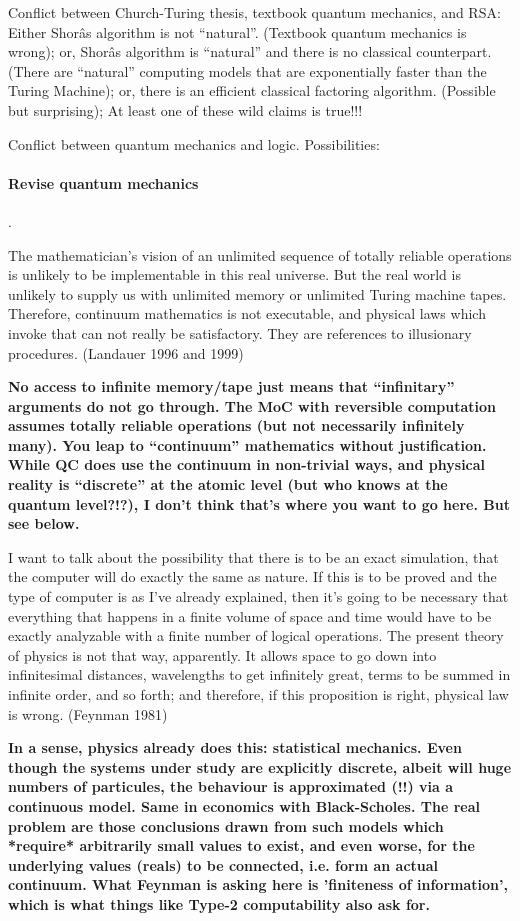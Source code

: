 \documentclass[12pt]{article}
\newcommand{\jc}[1]{\fbox{Jacques says:} \textbf{#1}}
\begin{document}
Conflict between Church-Turing thesis, textbook quantum mechanics, and
RSA: Either Shorâs algorithm is not ``natural''. (Textbook quantum
mechanics is wrong); or, Shorâs algorithm is ``natural'' and there is
no classical counterpart. (There are ``natural'' computing models that
are exponentially faster than the Turing Machine); or, there is an
efficient classical factoring algorithm. (Possible but surprising); At
least one of these wild claims is true!!!

Conflict between quantum mechanics and logic. Possibilities:

\paragraph*{Revise quantum mechanics}.

The mathematician's vision of an unlimited sequence of totally
reliable operations is unlikely to be implementable in this real
universe.  But the real world is unlikely to supply us with unlimited
memory or unlimited Turing machine tapes. Therefore, continuum
mathematics is not executable, and physical laws which invoke that can
not really be satisfactory. They are references to illusionary
procedures.  (Landauer 1996 and 1999)

\jc{No access to infinite memory/tape just means that ``infinitary''
arguments do not go through. The MoC with reversible computation
assumes totally reliable operations (but not necessarily infinitely
many). You leap to ``continuum'' mathematics without justification.
While QC does use the continuum in non-trivial ways, and physical
reality is ``discrete'' at the atomic level (but who knows at the
quantum level?!?), I don't think that's where you want to go here.
But see below.}

I want to talk about the possibility that there is to be an exact
simulation, that the computer will do exactly the same as nature. If
this is to be proved and the type of computer is as I've already
explained, then it's going to be necessary that everything that
happens in a finite volume of space and time would have to be exactly
analyzable with a finite number of logical operations. The present
theory of physics is not that way, apparently. It allows space to go
down into infinitesimal distances, wavelengths to get infinitely
great, terms to be summed in infinite order, and so forth; and
therefore, if this proposition is right, physical law is wrong.
(Feynman 1981)

\jc{In a sense, physics already does this: statistical mechanics.
Even though the systems under study are explicitly discrete, albeit
will huge numbers of particules, the behaviour is approximated (!!)
via a continuous model. Same in economics with Black-Scholes.
The real problem are those conclusions drawn from such models which
*require* arbitrarily small values to exist, and even worse, for
the underlying values (reals) to be connected, i.e. form an actual
continuum. What Feynman is asking here is 'finiteness of information',
which is what things like Type-2 computability also ask for.}
\end{document}
